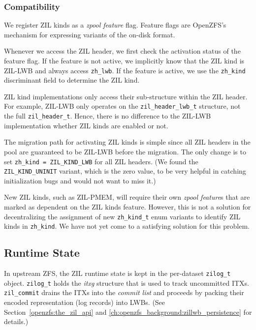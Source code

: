 \documentclass[12pt,a4paper,twoside]{book}
\begin{document}
\subsubsection{Compatibility}

We register ZIL kinds as a \textit{zpool feature} flag.
Feature flags are OpenZFS's mechanism for expressing variants of the on-disk format.

Whenever we access the ZIL header, we first check the activation status of the feature flag.
If the feature is not active, we implicitly know that the ZIL kind is ZIL-LWB and always access \lstinline{zh_lwb}.
If the feature is active, we use the \lstinline{zh_kind} discriminant field to determine the ZIL kind.

ZIL kind implementations only access their sub-structure within the ZIL header.
For example, ZIL-LWB only operates on the \lstinline{zil_header_lwb_t} structure, not the full \lstinline{zil_header_t}.
Hence, there is no difference to the ZIL-LWB implementation whether ZIL kinds are enabled or not.

The migration path for activating ZIL kinds is simple since all ZIL headers in the pool are guaranteed to be ZIL-LWB before the migration.
The only change is to set \lstinline{zh_kind = ZIL_KIND_LWB} for all ZIL headers.
(We found the \lstinline{ZIL_KIND_UNINIT} variant, which is the zero value, to be very helpful in catching initialization bugs and would not want to miss it.)

New ZIL kinds, such as ZIL-PMEM, will require their own \textit{zpool feature}s that are marked as dependent on the ZIL kinds feature.
However, this is not a solution for decentralizing the assignment of new \lstinline{zh_kind_t} enum variants to identify ZIL kinds in \lstinline{zh_kind}.
We have not yet come to a satisfying solution for this problem.

\subsection{Runtime State}\label{sec:zil_kinds:runtime}
In upstream ZFS, the ZIL runtime state is kept in the per-dataset \lstinline{zilog_t} object.
\lstinline{zilog_t} holds the \textit{itxg} structure that is used to track uncommitted ITXs.
\lstinline{zil_commit} drains the ITXs into the \textit{commit list} and proceeds by packing their encoded representation (log records) into LWBs.
(See Section~\ref{openzfs:the_zil_api} and \ref{ch:openzfs_background:zillwb_persistence} for details.)
\end{document}
